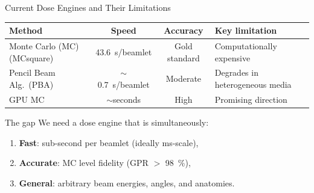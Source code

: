 \documentclass[aspectratio=169, 10pt]{beamer}
\begin{document}
\begin{frame}{Current Dose Engines and Their Limitations}
  \begin{table}
    \centering\small
    \begin{tabular}{lccl}
      \toprule
      \textbf{Method} & \textbf{Speed} & \textbf{Accuracy} & \textbf{Key limitation} \\
      \midrule
      Monte Carlo (MC) (MCsquare) & \SI{43.6}{s}/beamlet & Gold standard &
        Computationally expensive \\
      Pencil Beam Alg.\ (PBA) & $\sim$\SI{0.7}{s}/beamlet & Moderate &
        Degrades in heterogeneous media \\
      GPU MC & $\sim$seconds & High &
        Promising direction \\
      \bottomrule
    \end{tabular}
  \end{table}

  \vspace{6pt}
  \begin{block}{The gap}
    We need a dose engine that is simultaneously:
    \begin{enumerate}
      \item \textbf{Fast}: sub-second per beamlet (ideally ms-scale),
      \item \textbf{Accurate}: MC level fidelity (GPR $>$ \SI{98}{\percent}),
      \item \textbf{General}: arbitrary beam energies, angles, and anatomies.
    \end{enumerate}
  \end{block}
\end{frame}
\end{document}
